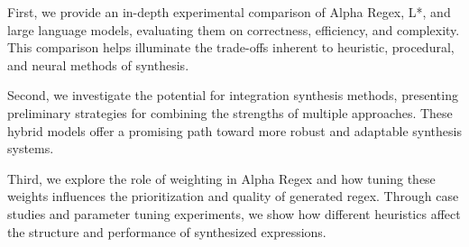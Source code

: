 \indent\indent First, we provide an in-depth experimental comparison of Alpha Regex, L*, and large language models, evaluating them on correctness, efficiency, and complexity. This comparison helps illuminate the trade-offs inherent to heuristic, procedural, and neural methods of synthesis.

\indent \indent Second, we investigate the potential for integration synthesis methods, presenting preliminary strategies for combining the strengths of multiple approaches. These hybrid models offer a promising path toward more robust and adaptable synthesis systems.

\indent \indent Third, we explore the role of weighting in Alpha Regex and how tuning these weights influences the prioritization and quality of generated regex. Through case studies and parameter tuning experiments, we show how different heuristics affect the structure and performance of synthesized expressions. 
